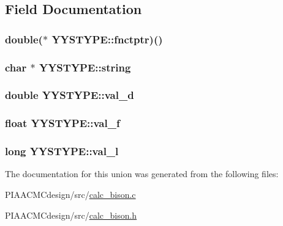 \subsection{Field Documentation}
\hypertarget{unionYYSTYPE_a2ede02959c9774fe63cc959095e4a50f}{
\subsubsection[{fnctptr}]{\setlength{\rightskip}{0pt plus 5cm}double($\ast$ Y\+Y\+S\+T\+Y\+P\+E\+::fnctptr)()}}\label{unionYYSTYPE_a2ede02959c9774fe63cc959095e4a50f}
\hypertarget{unionYYSTYPE_a0138efb4387041e915681aff6dfd68ff}{
\subsubsection[{string}]{\setlength{\rightskip}{0pt plus 5cm}char $\ast$ Y\+Y\+S\+T\+Y\+P\+E\+::string}}\label{unionYYSTYPE_a0138efb4387041e915681aff6dfd68ff}
\hypertarget{unionYYSTYPE_a61bc717a8d5bde0979541eb670984140}{
\subsubsection[{val\+\_\+d}]{\setlength{\rightskip}{0pt plus 5cm}double Y\+Y\+S\+T\+Y\+P\+E\+::val\+\_\+d}}\label{unionYYSTYPE_a61bc717a8d5bde0979541eb670984140}
\hypertarget{unionYYSTYPE_a6f4050b34641ae09204f63c853cb4c92}{
\subsubsection[{val\+\_\+f}]{\setlength{\rightskip}{0pt plus 5cm}float Y\+Y\+S\+T\+Y\+P\+E\+::val\+\_\+f}}\label{unionYYSTYPE_a6f4050b34641ae09204f63c853cb4c92}
\hypertarget{unionYYSTYPE_a81f209066080f5ffa329c1772b8b70c5}{
\subsubsection[{val\+\_\+l}]{\setlength{\rightskip}{0pt plus 5cm}long Y\+Y\+S\+T\+Y\+P\+E\+::val\+\_\+l}}\label{unionYYSTYPE_a81f209066080f5ffa329c1772b8b70c5}


The documentation for this union was generated from the following files\+:\begin{DoxyCompactItemize}
\item 
P\+I\+A\+A\+C\+M\+Cdesign/src/\hyperlink{PIAACMCdesign_2src_2calc__bison_8c}{calc\+\_\+bison.\+c}\item 
P\+I\+A\+A\+C\+M\+Cdesign/src/\hyperlink{PIAACMCdesign_2src_2calc__bison_8h}{calc\+\_\+bison.\+h}\end{DoxyCompactItemize}

